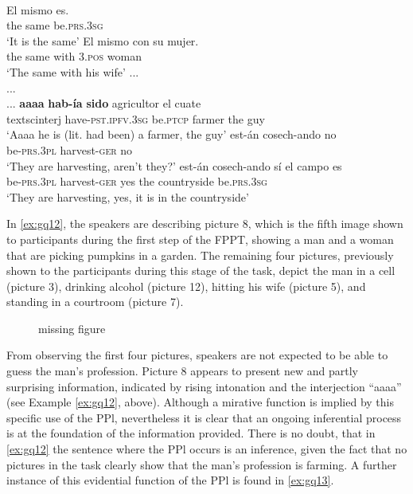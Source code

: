 \documentclass[output=paper]{langsci/langscibook}
\begin{document}
\ea \label{ex:gq12}
\\
	\ea \label{ex:gq12a}
	\gll El mismo es.\\
	the same be.\textsc{prs.3sg}\\
	\glt ‘It is the same’
	\ex \label{ex:gq12b}
	\gll  El mismo con su mujer.\\
	the same with \textsc{3.pos} woman\\
	\glt ‘The same with his wife’
	\ex  \label{ex:gq12c}
	\gll ...\\
	{...}\\
	\glt ...
	\ex \label{ex:gq12d}
	\gll \textbf{aaaa} \textbf{hab-ía} \textbf{sido} agricultor el cuate\\
	textsc{interj} have-\textsc{pst.ipfv.3sg} be.\textsc{ptcp} farmer the guy\\
	\glt ‘Aaaa he is (lit. had been) a farmer, the guy’
	\ex \label{ex:gq12e}
	\gll est-án cosech-ando no\\
	be-\textsc{prs.3pl} harvest-\textsc{ger} no\\
	\glt ‘They are harvesting, aren’t they?’
	\ex \label{ex:gq12f}
	\gll est-án cosech-ando sí el  campo es\\
	be-\textsc{prs.3pl} harvest-\textsc{ger} yes the countryside be.\textsc{prs.3sg}\\
	\glt ‘They are harvesting, yes, it is in the countryside’
	\z
\z

In \ref{ex:gq12}, the speakers are describing picture 8, which is the fifth image shown to participants during the first step of the FPPT, showing a man and a woman that are picking pumpkins in a garden. The remaining four pictures, previously shown to the participants during this stage of the task, depict the man in a cell (picture 3), drinking alcohol (picture 12), hitting his wife (picture 5), and standing in a courtroom (picture 7). %


\begin{figure}
  \caption{missing figure}
  \label{fig:gq2}
\end{figure}


From observing the first four pictures, speakers are not expected to be able to guess the man’s profession. Picture 8 appears to present new and partly surprising information, indicated by rising intonation and the interjection “aaaa” (see Example \ref{ex:gq12}, above). Although a mirative function is implied by this specific use of the PPl, nevertheless it is clear that an ongoing inferential process is at the foundation of the information provided. There is no doubt, that in \ref{ex:gq12} the sentence where the PPl occurs is an inference, given the fact that no pictures in the task clearly show that the man’s profession is farming. A further instance of this evidential function of the PPl is found in \ref{ex:gq13}. 
\end{document}
